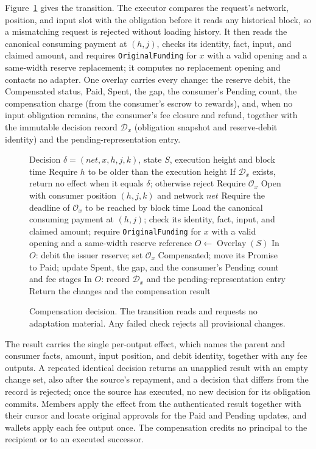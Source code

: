 Figure~\ref{fig:protocol-decision} gives the transition. The executor compares the request's network, position, and input slot with the obligation before it reads any historical block, so a mismatching request is rejected without loading history. It then reads the canonical consuming payment at $(h,j)$, checks its identity, fact, input, and claimed amount, and requires \texttt{OriginalFunding} for $x$ with a valid opening and a same-width reserve replacement; it computes no replacement opening and contacts no adapter. One overlay carries every change: the reserve debit, the Compensated status, Paid, Spent, the gap, the consumer's Pending count, the compensation charge (from the consumer's escrow to rewards), and, when no input obligation remains, the consumer's fee closure and refund, together with the immutable decision record $\mathcal D_x$ (obligation snapshot and reserve-debit identity) and the pending-representation entry.

\begin{figure}[t]
  \small
  \begin{algorithmic}[1]
    \REQUIRE Decision $\delta=(\mathit{net},x,h,j,k)$, state $S$,
    execution height and block time
    \STATE Require $h$ to be older than the execution height
    \STATE If $\mathcal D_x$ exists, return no effect when it equals
    $\delta$; otherwise reject
    \STATE Require $\mathcal O_x$ Open with consumer position $(h,j,k)$
    and network $\mathit{net}$
    \STATE Require the deadline of $\mathcal O_x$ to be reached by block time
    \STATE Load the canonical consuming payment at $(h,j)$; check its
    identity, fact, input, and claimed amount; require
    \texttt{OriginalFunding} for $x$ with a valid opening and a
    same-width reserve reference
    \STATE $O\gets\operatorname{Overlay}(S)$
    \STATE In $O$: debit the issuer reserve; set $\mathcal O_x$ Compensated;
    move its Promise to Paid; update Spent, the gap, and the consumer's
    Pending count and fee stages
    \STATE In $O$: record $\mathcal D_x$ and the pending-representation
    entry
    \STATE Return the changes and the compensation result
  \end{algorithmic}
  \caption{Compensation decision. The transition reads and requests no
    adaptation material. Any failed check rejects all provisional
    changes.}
  \label{fig:protocol-decision}
\end{figure}

The result carries the single per-output effect, which names the parent and consumer facts, amount, input position, and debit identity, together with any fee outputs. A repeated identical decision returns an unapplied result with an empty change set, also after the source's repayment, and a decision that differs from the record is rejected; once the source has executed, no new decision for its obligation commits. Members apply the effect from the authenticated result together with their cursor and locate original approvals for the Paid and Pending updates, and wallets apply each fee output once. The compensation credits no principal to the recipient or to an executed successor.
